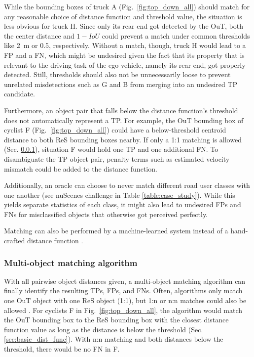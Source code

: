 \documentclass[conference]{IEEEtran}
\begin{document}
While the bounding boxes of truck A (Fig.~\ref{fig:top_down_all}) should match for any reasonable choice of distance function and threshold value, the situation is less obvious for truck H.
Since only its rear end got detected by the OuT, both the center distance and $1 - IoU$ could prevent a match under common thresholds like \SI{2}{\metre} or $0.5$, respectively. 
Without a match, though, truck H would lead to a FP and a FN, which might be undesired given the fact that its property that is relevant to the driving task of the ego vehicle, namely its rear end, got properly detected. 
Still, thresholds should also not be unnecessarily loose to prevent unrelated misdetections such as G and B from merging into an undesired TP candidate.


Furthermore, an object pair that falls below the distance function's threshold does not automatically represent a TP. 
For example, the OuT bounding box of cyclist F (Fig.~\ref{fig:top_down_all}) could have a below-threshold centroid distance to both ReS bounding boxes nearby. 
If only a 1:1 matching is allowed (Sec. \ref{sec:basic_multi_obj_matching}), situation F would hold one TP and one additional FN.
To disambiguate the TP object pair, penalty terms such as estimated velocity mismatch could be added to the distance function.

Additionally, an oracle can choose to never match different road user classes with one another (see nuScenes challenge in Table \ref{table:case_study}). 
While this yields separate statistics of each class, it might also lead to undesired FPs and FNs for misclassified objects that otherwise got perceived perfectly.

Matching can also be performed by a machine-learned system instead of a hand-crafted distance function \cite{Sondell2018}.




\subsubsection{Multi-object matching algorithm}
\label{sec:basic_multi_obj_matching}

With all pairwise object distances given, a multi-object matching algorithm can finally identify the resulting TPs, FPs, and FNs. 
Often, algorithms only match one OuT object with one ReS object (1:1), but 1:n or n:n matches could also be allowed \cite[Sec. 11.3]{Brahmi2020diss}. 
For cyclists F in Fig.~\ref{fig:top_down_all}, the algorithm would match the OuT bounding box to the ReS bounding box with the closest distance function value as long as the distance is below the threshold (Sec. \ref{sec:basic_dist_func}). 
With n:n matching and both distances below the threshold, there would be no FN in F.
\end{document}
